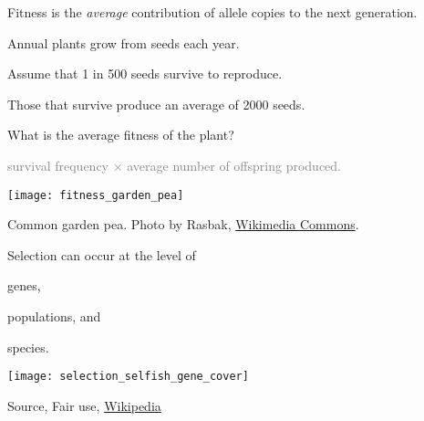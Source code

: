 \documentclass[t]{beamer}
\begin{document}
\begin{frame}[t,plain]{Fitness is the \textit{average} contribution of allele copies to the next generation.}

\vspace{-\baselineskip}

\begin{multicols}{2}
\hangpara Annual plants grow from seeds each year.

\hangpara Assume that 1 in 500 seeds survive to reproduce. 

\hangpara Those that survive produce an average of 2000 seeds. 

\hangpara What is the average fitness of the plant?

\hangpara \textcolor{gray}{survival frequency $\times$ average number of offspring produced.}
\columnbreak

\begin{center}
\texttt{[image: fitness\_garden\_pea]}
\end{center}


\end{multicols}

\vfilll

\tiny \hfill Common garden pea. Photo by Rasbak, \href{https://commons.wikimedia.org/w/index.php?curid=194762}{Wikimedia Commons}. 

\end{frame}

\begin{frame}[t,plain]{Selection can occur at the level of }

\vspace{-\baselineskip}

\begin{multicols}{2}
\hangpara genes,

\hangpara {}

\hangpara populations, and

\hangpara species.

\columnbreak

\begin{center}
\texttt{[image: selection\_selfish\_gene\_cover]}
\end{center}

\end{multicols}

\vfilll

\tiny \hfill Source, Fair use, \href{https://en.wikipedia.org/w/index.php?curid=20132319}{Wikipedia} 
\end{frame}
\end{document}
